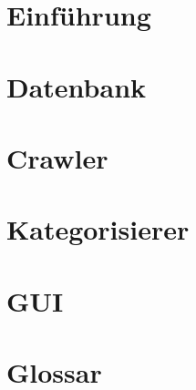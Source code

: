 

	\maketitle
	\setcounter{tocdepth}{1}
	\tableofcontents

	\chapter{Einführung}
			
	\chapter{Datenbank}
	\label{chap:datenbank}
		
	\chapter{Crawler}
	\label{chap:crawler}
		
	\chapter{Kategorisierer}
	\label{chap:kategorisierer}
		
	\chapter{GUI}
	\label{chap:gui}
		
	\chapter{Glossar}
		

